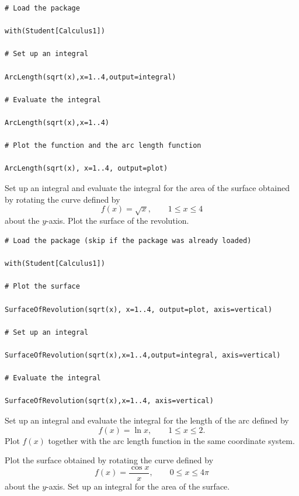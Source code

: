 \documentclass[]{book}
\theoremstyle{definition}
\theoremstyle{definition}
\theoremstyle{definition}
\theoremstyle{remark}
\let\BeginKnitrBlock\begin \let\EndKnitrBlock\end
\begin{document}
\BeginKnitrBlock{solution}
{}

\begin{verbatim}
# Load the package

with(Student[Calculus1])

# Set up an integral

ArcLength(sqrt(x),x=1..4,output=integral)

# Evaluate the integral

ArcLength(sqrt(x),x=1..4)

# Plot the function and the arc length function

ArcLength(sqrt(x), x=1..4, output=plot)
\end{verbatim}
\EndKnitrBlock{solution}

\BeginKnitrBlock{example}
\protect\hypertarget{exm:unnamed-chunk-3}{}{\label{exm:unnamed-chunk-3} }
Set up an integral and evaluate the integral for the area of the surface obtained by rotating the curve defined by
\[
f(x)=\sqrt{x},\qquad 1\leq x\leq 4
\]
about the \(y\)-axis. Plot the surface of the revolution.
\EndKnitrBlock{example}

\BeginKnitrBlock{solution}
{}

\begin{verbatim}
# Load the package (skip if the package was already loaded)

with(Student[Calculus1])

# Plot the surface

SurfaceOfRevolution(sqrt(x), x=1..4, output=plot, axis=vertical)

# Set up an integral

SurfaceOfRevolution(sqrt(x),x=1..4,output=integral, axis=vertical)

# Evaluate the integral

SurfaceOfRevolution(sqrt(x),x=1..4, axis=vertical)
\end{verbatim}
\EndKnitrBlock{solution}

\BeginKnitrBlock{exercise}
\protect\hypertarget{exr:unnamed-chunk-5}{}{\label{exr:unnamed-chunk-5} }
Set up an integral and evaluate the integral for the length of the arc defined by
\[
f(x)=\ln x, \qquad 1\leq x\leq 2.
\]
Plot \(f(x)\) together with the arc length function in the same coordinate system.
\EndKnitrBlock{exercise}

\BeginKnitrBlock{exercise}
\protect\hypertarget{exr:unnamed-chunk-6}{}{\label{exr:unnamed-chunk-6} }
Plot the surface obtained by rotating the curve defined by
\[
f(x)=\frac{\cos x}{x}, \qquad 0\leq x\leq 4\pi
\]
about the \(y\)-axis. Set up an integral for the area of the surface.
\EndKnitrBlock{exercise}
\end{document}
